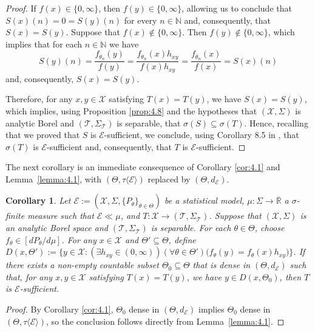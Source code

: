 \documentclass[12pt]{article}
\newtheorem{corollary}{Corollary}[section]
\begin{document}
\begin{proof}
If $f(x)\in \{0,\infty \}$, then $f(y)\in \{0,\infty \}$, allowing us to conclude that $S(x)(n)=0=S(y)(n)$ for every $n\in\mathbb{N}$ and, consequently, that $S(x)=S(y)$. Suppose that $f(x)\notin \{0,\infty \}$. Then $f(y)\notin\{0,\infty \}$, which implies that for each $n\in\mathbb{N}$ we have $$S(y)(n)=\frac{f_{\theta _n}(y)}{f(y)}=\frac{f_{\theta _n}(x)h_{xy}}{f(x)h_{xy}}=\frac{f_{\theta _n}(x)}{f(x)}=S(x)(n)$$ and, consequently, $S(x)=S(y)$.

Therefore, for any $x,y\in \mathcal{X}$ satisfying $T(x)=T(y)$, we have $S(x)=S(y)$, which implies, using Proposition \ref{prop:4.8} and the hypotheses that $(\mathcal{X},\Sigma )$ is analytic Borel and $(\mathcal{T},\Sigma _\mathcal{T})$ is separable, that $\sigma (S)\subseteq \sigma (T)$. Hence, recalling that we proved that $S$ is $\mathcal{E}$-sufficient, we conclude, using Corollary 8.5 in  \cite{Heyer1982}, that $\sigma (T)$ is $\mathcal{E}$-sufficient and, consequently, that $T$ is $\mathcal{E}$-sufficient.
\end{proof}

The next corollary is an immediate consequence of Corollary \ref{cor:4.1} and Lemma~\ref{lemma:4.1}, with
$(\Theta,\tau\langle\mathcal E\rangle)$ replaced by $(\Theta,d_{\mathcal E})$.

\begin{corollary}
\label{cor:4.2}
Let $\mathcal{E}:=(\mathcal{X},\Sigma,\{P_\theta\}_{\theta\in\Theta})$ be a statistical model, $\mu :\Sigma\to\overline{\mathbb{R}}$ a $\sigma$-finite measure such that $\mathcal{E}\ll \mu$, and $T:\mathcal{X}\to (\mathcal{T},\Sigma _\mathcal{T})$. Suppose that $(\mathcal{X},\Sigma )$ is an analytic Borel space and $(\mathcal{T},\Sigma _\mathcal{T})$ is separable. For each $\theta\in\Theta$, choose $f_\theta \in [dP_\theta /d\mu ]$. For any $x\in \mathcal{X}$ and $\Theta'\subseteq\Theta$, define $D(x,\Theta '):=\big\{y\in \mathcal{X}:(\exists h_{xy}\in (0,\infty ))(\forall \theta \in \Theta ')\big(f_\theta (y)=f_\theta (x)h_{xy}\big)\big\}$. If there exists a non-empty countable subset $\Theta _0\subseteq\Theta$ that is dense in $(\Theta,d_\mathcal{E})$ such that, for any $x,y\in\mathcal{X}$ satisfying $T(x)=T(y)$, we have $y\in D(x,\Theta _0)$, then $T$ is $\mathcal{E}$-sufficient.
\end{corollary}
\begin{proof}
    By Corollary \ref{cor:4.1}, $\Theta_0$ dense in $(\Theta,d_{\mathcal E})$ implies $\Theta_0$ dense in $(\Theta,\tau\langle\mathcal E\rangle)$, so the conclusion follows directly from Lemma~\ref{lemma:4.1}.
\end{proof}
\end{document}
